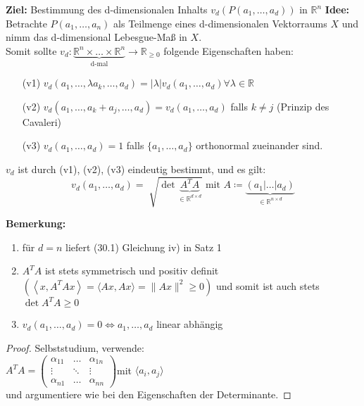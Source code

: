 \textbf{Ziel:} Bestimmung des d-dimensionalen Inhalts 
$v_d (P(a_1, \ldots, a_d))$ in $\mathbb{R}^n $
\textbf{Idee:} Betrachte $P(a_1, \ldots, a_n)$ als Teilmenge eines d-dimensionalen
Vektorraums $X$ und nimm das d-dimensional Lebesgue-Maß in $X$.\\
Somit sollte $v_d: 
\underbrace{\mathbb{R}^n \times \ldots \times \mathbb{R}^n }_{\text{d-mal}}
\rightarrow \mathbb{R}_{\geq 0} $
folgende Eigenschaften haben:
\begin{enumerate}
    \item[(v1)]
        $v_d (a_1, \ldots, \lambda a_k, \ldots, a_d) = |\lambda| v_d(a_1, \ldots, a_d)
        \forall \lambda \in \mathbb{R} $
    \item[(v2)]
        $v_d (a_1, \ldots, a_k + a_j, \ldots, a_d) = v_d(a_1, \ldots, a_d) $
        falls $k \neq j$ (Prinzip des Cavaleri)
    \item[(v3)]
        $v_d(a_1, \ldots, a_d) = 1 $ falls $\lbrace a_1, \ldots, a_d \rbrace $
        orthonormal zueinander sind.
\end{enumerate}

\begin{satz}
    $v_d$ ist durch (v1), (v2), (v3) eindeutig bestimmt, und es gilt:
    \begin{equation}
        v_d(a_1, \ldots, a_d) = 
        \sqrt[]{\det \underbrace{A^T A}_{\in \mathbb{R}^{d \times d}}}
        \text{ mit } 
        A \coloneqq\underbrace{(a_1 | \ldots | a_d)}_{\in \mathbb{R}^{n \times d}}
    \end{equation}
\end{satz}

\textbf{Bemerkung:}
\mbox{}
\begin{enumerate}
    \item
        für $d=n $ liefert (30.1) Gleichung iv) in Satz 1
    \item
        $A^T A $ ist stets symmetrisch und positiv definit
        $\left( \left\langle x, A^T Ax \right\rangle =
        \langle Ax, Ax \rangle = \|Ax\|^2 \geq 0 \right)$
        und somit ist auch stets $\det A^T A \geq 0 $
    \item
        $v_d (a_1, \ldots, a_d) = 0 \Leftrightarrow a_1, \ldots, a_d$ linear abhängig
\end{enumerate}

\begin{proof}
    Selbststudium, verwende:\\
    $A^T A = 
    \begin{pmatrix}
        \alpha_{11} & \ldots & \alpha_{1n} \\
        \vdots      & \ddots & \vdots \\
        \alpha_{n1} & \ldots & \alpha_{nn}
    \end{pmatrix}
    $mit $\langle a_i, a_j \rangle $ \\
    und argumentiere wie bei den Eigenschaften der Determinante.
\end{proof}

